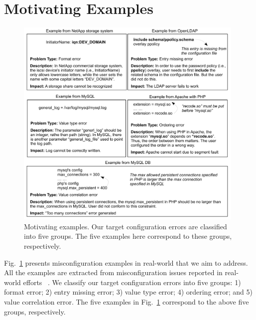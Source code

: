 
\section{Motivating Examples}

\begin{figure}[t] \centering
\includegraphics[width=0.98\textwidth]{figs/example}
\caption{Motivating examples. Our target configuration errors are
  classified into five groups. The five examples here correspond to
  these groups, respectively.}
\label{fig-example}
\end{figure}

Fig.~\ref{fig-example} presents misconfiguration examples in real-world
that we aim to address. All the examples are extracted from
misconfiguration issues reported in real-world efforts%
~\cite{yin11anempirical, configdataset}.
We classify our target configuration errors
into five groups: 1) format error; 2) entry missing error; 3) value type
error; 4) ordering error; and 5) value correlation error.
The five examples in Fig.~\ref{fig-example} correspond to the above five
groups, respectively.

 
